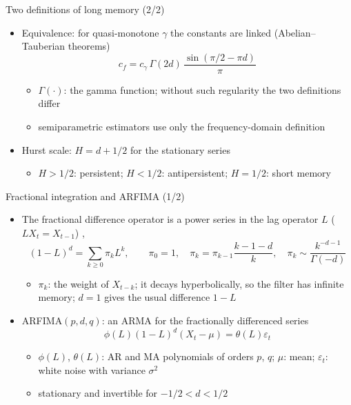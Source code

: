 \begin{frame}{Two definitions of long memory (2/2)}
\itemsize{\small}
\begin{itemize}
    \item Equivalence: for quasi-monotone $\gamma$ the constants are linked (Abelian--Tauberian theorems) 
    \[ c_f = c_\gamma\,\Gamma(2d)\,\frac{\sin(\pi/2 - \pi d)}{\pi} \]
    \begin{itemize}
        \item $\Gamma(\cdot)$: the gamma function; without such regularity the two definitions differ
        \item semiparametric estimators use only the frequency-domain definition
    \end{itemize}
    \item Hurst scale: $H = d + 1/2$ for the stationary series
    \begin{itemize}
        \item $H > 1/2$: persistent; $H < 1/2$: antipersistent; $H = 1/2$: short memory
    \end{itemize}
\end{itemize}
\end{frame}

\begin{frame}{Fractional integration and ARFIMA (1/2)}
\itemsize{\small}
\begin{itemize}
    \item The fractional difference operator is a power series in the lag operator $L$ ($LX_t = X_{t-1}$) , 
    \[ (1 - L)^d = \sum_{k\ge0}\pi_k L^k, \qquad \pi_0 = 1, \quad \pi_k = \pi_{k-1}\frac{k - 1 - d}{k}, \quad \pi_k \sim \frac{k^{-d-1}}{\Gamma(-d)} \]
    \begin{itemize}
        \item $\pi_k$: the weight of $X_{t-k}$; it decays hyperbolically, so the filter has infinite memory; $d = 1$ gives the usual difference $1 - L$
    \end{itemize}
    \item ARFIMA$(p,d,q)$: an ARMA for the fractionally differenced series
    \[ \phi(L)(1 - L)^d(X_t - \mu) = \theta(L)\varepsilon_t \]
    \begin{itemize}
        \item $\phi(L)$, $\theta(L)$: AR and MA polynomials of orders $p$, $q$; $\mu$: mean; $\varepsilon_t$: white noise with variance $\sigma^2$
        \item stationary and invertible for $-1/2 < d < 1/2$
    \end{itemize}
\end{itemize}
\end{frame}

